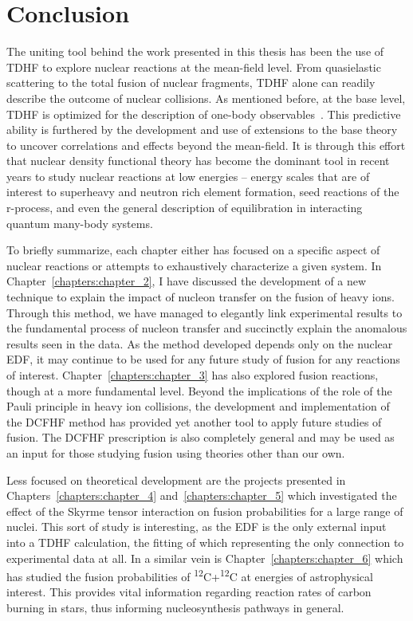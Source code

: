 

\chapter{Conclusion}
\label{sec:future_work_conclusion}
The uniting tool behind the work presented in this thesis has been the use of TDHF to explore nuclear reactions at the mean-field level.
From quasielastic scattering to the total fusion of nuclear fragments, TDHF alone can readily describe the outcome of nuclear collisions.
As mentioned before, at the base level, TDHF is optimized for the description of one-body observables~\citep{balian1981}.
This predictive ability is furthered by the development and use of extensions to the base theory to uncover correlations and effects beyond the mean-field.
It is through this effort that nuclear density functional theory has become the dominant tool in recent years to study nuclear reactions at low energies -- energy scales that are of interest to superheavy and neutron rich element formation, seed reactions of the r-process, and even the general description of equilibration in interacting quantum many-body systems.

To briefly summarize, each chapter either has focused on a specific aspect of nuclear reactions or attempts to exhaustively characterize a given system.
In Chapter~\ref{chapters:chapter_2}, I have discussed the development of a new technique to explain the impact of nucleon transfer on the fusion of heavy ions.
Through this method, we have managed to elegantly link experimental results to the fundamental process of nucleon transfer and succinctly explain the anomalous results seen in the data.
As the method developed depends only on the nuclear EDF, it may continue to be used for any future study of fusion for any reactions of interest.
Chapter~\ref{chapters:chapter_3} has also explored fusion reactions, though at a more fundamental level.
Beyond the implications of the role of the Pauli principle in heavy ion collisions, the development and implementation of the DCFHF method has provided yet another tool to apply future studies of fusion.
The DCFHF prescription is also completely general and may be used as an input for those studying fusion using theories other than our own.

Less focused on theoretical development are the projects presented in Chapters~\ref{chapters:chapter_4} and~\ref{chapters:chapter_5} which investigated the effect of the Skyrme tensor interaction on fusion probabilities for a large range of nuclei.
This sort of study is interesting, as the EDF is the only external input into a TDHF calculation, the fitting of which representing the only connection to experimental data at all.
In a similar vein is Chapter~\ref{chapters:chapter_6} which has studied the fusion probabilities of \textsuperscript{12}C+\textsuperscript{12}C at energies of astrophysical interest.
This provides vital information regarding reaction rates of carbon burning in stars, thus informing nucleosynthesis pathways in general. 

